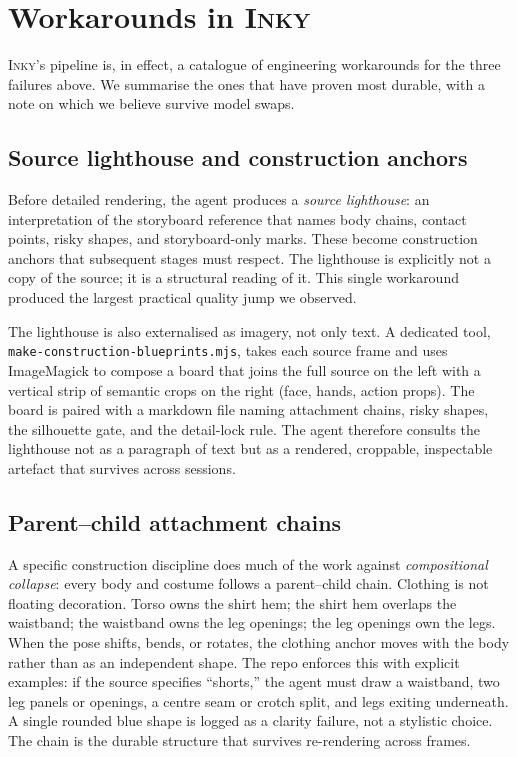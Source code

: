 \documentclass[10pt,twocolumn]{article}
\newcommand{\term}[1]{\textit{#1}}
\newcommand{\inky}{\textsc{Inky}}
\begin{document}
\section{Workarounds in \inky{}}

\inky{}'s pipeline is, in effect, a catalogue of engineering
workarounds for the three failures above. We summarise the ones that
have proven most durable, with a note on which we believe survive
model swaps.

\subsection{Source lighthouse and construction anchors}

Before detailed rendering, the agent produces a \emph{source
lighthouse}: an interpretation of the storyboard reference that names
body chains, contact points, risky shapes, and storyboard-only
marks. These become construction anchors that subsequent stages must
respect. The lighthouse is explicitly not a copy of the source; it is
a structural reading of it. This single workaround produced the
largest practical quality jump we observed.

The lighthouse is also externalised as imagery, not only text. A
dedicated tool, \texttt{make-construction-blueprints.mjs}, takes
each source frame and uses ImageMagick to compose a board that
joins the full source on the left with a vertical strip of
semantic crops on the right (face, hands, action props). The
board is paired with a markdown file naming attachment chains,
risky shapes, the silhouette gate, and the detail-lock rule.
The agent therefore consults the lighthouse not as a paragraph
of text but as a rendered, croppable, inspectable artefact that
survives across sessions.

\subsection{Parent--child attachment chains}

A specific construction discipline does much of the work against
\term{compositional collapse}: every body and costume follows a
parent--child chain. Clothing is not floating decoration. Torso owns
the shirt hem; the shirt hem overlaps the waistband; the waistband
owns the leg openings; the leg openings own the legs. When the pose
shifts, bends, or rotates, the clothing anchor moves with the body
rather than as an independent shape. The repo enforces this with
explicit examples: if the source specifies ``shorts,'' the agent
must draw a waistband, two leg panels or openings, a centre seam or
crotch split, and legs exiting underneath. A single rounded blue
shape is logged as a clarity failure, not a stylistic choice. The
chain is the durable structure that survives re-rendering across
frames.
\end{document}
